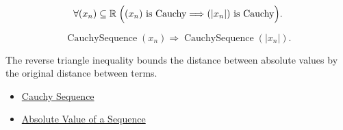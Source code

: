 \begin{remark*}
\[
\forall (x_n)\subseteq\mathbb{R}\;
\Bigl(
  (x_n)\text{ is Cauchy}
  \Longrightarrow
  (|x_n|)\text{ is Cauchy}
\Bigr).
\]
\end{remark*}

\begin{remark*}
\[
\operatorname{CauchySequence}(x_n)
\Longrightarrow
\operatorname{CauchySequence}(|x_n|).
\]
\end{remark*}

\begin{remark*}[Interpretation]
The reverse triangle inequality bounds the distance between absolute values
by the original distance between terms.
\end{remark*}

\begin{dependencies}
\begin{itemize}
  \item \hyperref[def:cauchy-sequence]{Cauchy Sequence}
  \item \hyperref[def:absolute-value-sequence]{Absolute Value of a Sequence}
\end{itemize}
\end{dependencies}
